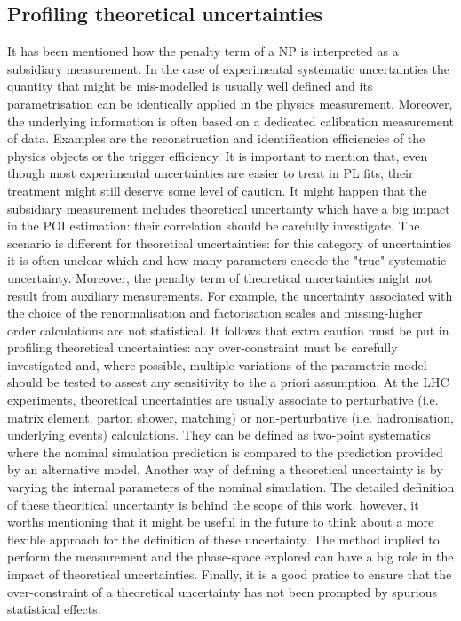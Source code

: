 \documentclass[12pt]{article}
\begin{document}
\subsection{Profiling theoretical uncertainties}
It has been mentioned how the penalty term of a NP is interpreted as a subsidiary measurement. In the case of experimental systematic uncertainties the quantity that might be mis-modelled is usually well defined and its parametrisation can be identically applied in the physics measurement. Moreover, the underlying information is often based on a dedicated calibration measurement of data. Examples are the reconstruction and identification efficiencies of the physics objects or the trigger efficiency. It is important to mention that, even though most experimental uncertainties are easier to treat in PL fits, their treatment might still deserve some level of caution. It might happen that the subsidiary measurement includes theoretical uncertainty which have a big impact in the POI estimation: their correlation should be carefully investigate.
The scenario is different for theoretical uncertainties: for this category of uncertainties it is often unclear which and how many parameters encode the "true" systematic uncertainty. Moreover, the penalty term of theoretical uncertainties might not result from auxiliary measurements. For example, the uncertainty associated with the choice of the renormalisation and factorisation scales and missing-higher order calculations are not statistical. It follows that extra caution must be put in profiling theoretical uncertainties: any over-constraint must be carefully investigated and, where possible, multiple variations of the parametric model should be tested to assest any sensitivity to the a priori assumption.
At the LHC experiments, theoretical uncertainties are usually associate to perturbative (i.e. matrix element, parton shower, matching) or non-perturbative (i.e. hadronisation, underlying events) calculations. They can be defined as two-point systematics where the nominal simulation prediction is compared to the prediction provided by an alternative model. Another way of defining a theoretical uncertainty is by varying the internal parameters of the nominal simulation. The detailed definition of these theoritical uncertainty is behind the scope of this work, however, it worths mentioning that it might be useful in the future to think about a more flexible approach for the definition of these uncertainty. The method implied to perform the measurement and the phase-space explored can have a big role in the impact of theoretical uncertainties. 
Finally, it is a good pratice to ensure that the over-constraint of a theoretical uncertainty has not been prompted by spurious statistical effects. 
\end{document}
